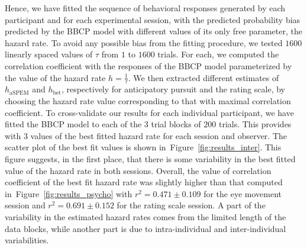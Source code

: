 \documentclass[10pt,letterpaper]{article}
\newcommand{\seeFig}[1]{Figure~\ref{fig:#1}}
\newcommand{\CP}[1]{\textbf{\textcolor{green}{[CP: #1]}}}
\begin{document}
Hence, we have fitted the sequence of behavioral responses generated by each participant and
for each experimental session, with the predicted probability bias predicted by the BBCP model
with different values of its only free parameter, the hazard rate.
To avoid any possible bias from the fitting procedure,
we tested $1600$ linearly spaced values of $\tau$ from $1$ to $1600$ trials.
For each, we computed the correlation coefficient with the responses of the BBCP model parameterized
by the value of the hazard rate $h = \frac 1 \tau$.
We then extracted different estimates of $h_{\text{aSPEM}}$ and $h_{\text{bet}}$,
respectively for anticipatory pursuit and the rating scale,
by choosing the hazard rate value corresponding to that with maximal correlation coefficient.
To cross-validate our results for each individual participant,
we have fitted the BBCP model to each of the $3$ trial blocks of $200$ trials.
This provides with $3$ values of the best fitted hazard rate for each session and observer.
The scatter plot of the best fit values is shown in~\seeFig{results_inter}.
This figure suggests, in the first place, that there is some variability
in the best fitted value of the hazard rate in both sessions.
Overall, the value of correlation coefficient of the best fit hazard rate
was slightly higher than that computed in~\seeFig{results_psycho}
with $r^{2} = 0.471 \pm 0.109$ for the eye movement session
 and $r^{2} = 0.691 \pm 0.152$ for the rating scale session.
A part of the variability in the estimated hazard rates comes
from the limited length of the data blocks,
while another part is due to intra-individual and inter-individual variabilities.
\end{document}
